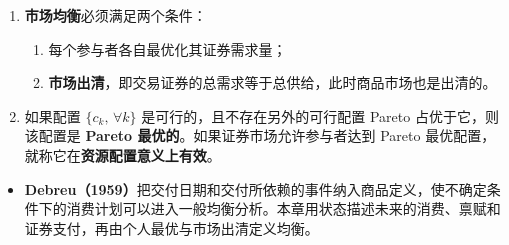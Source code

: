 \begin{tcolorbox}[summary]
\begin{enumerate}
    \item \textbf{市场均衡}必须满足两个条件：
    \begin{enumerate}[label=(\alph*)]
        \item 每个参与者各自最优化其证券需求量；
        \item \textbf{市场出清}，即交易证券的总需求等于总供给，此时商品市场也是出清的。
    \end{enumerate}

    \item 如果配置 $\{c_k,\,\forall k\}$ 是可行的，且不存在另外的可行配置 Pareto 占优于它，则该配置是 \textbf{Pareto 最优的}。如果证券市场允许参与者达到 Pareto 最优配置，就称它在\textbf{资源配置意义上有效}。


\end{enumerate}
\end{tcolorbox}

\begin{tcolorbox}[knowledge,breakable=false,title={参考文献与本章贡献}]
\begin{itemize}
 \item \textbf{Debreu（1959）}把交付日期和交付所依赖的事件纳入商品定义，使不确定条件下的消费计划可以进入一般均衡分析。本章用状态描述未来的消费、禀赋和证券支付，再由个人最优与市场出清定义均衡。
\end{itemize}
\end{tcolorbox}

\fi

\WJChapterExercises

\endgroup
